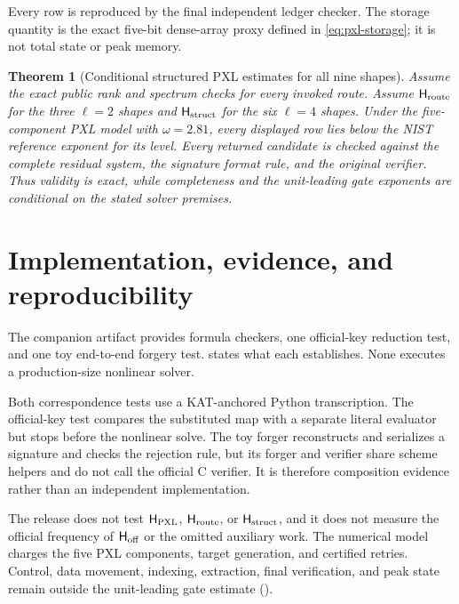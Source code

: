 \documentclass[11pt]{article}
\newtheorem{theorem}{Theorem}[section]
\begin{document}
Every row is reproduced by the final independent ledger checker.  The storage
quantity is the exact five-bit dense-array proxy defined in
\eqref{eq:pxl-storage}; it is not total state or peak memory.

\begin{theorem}[Conditional structured PXL estimates for all nine shapes]
\label{thm:pxl-all-nine-structured}
Assume the exact public rank and spectrum checks for every invoked route.
Assume $\mathsf H_{\rm route}$ for the three $\ell=2$ shapes and
$\mathsf H_{\rm struct}$ for the six $\ell=4$ shapes.  Under the
five-component PXL model with $\omega=2.81$, every displayed row lies below
the NIST reference exponent for its level.  Every returned candidate is
checked against the complete residual system, the signature format rule, and
the original verifier.  Thus validity is exact, while completeness and the
unit-leading gate exponents are conditional on the stated solver premises.
\end{theorem}

\section{Implementation, evidence, and reproducibility}
\label{sec:implementation}

The companion artifact provides formula checkers, one official-key reduction
test, and one toy end-to-end forgery test.  
states what each establishes.  None executes a production-size nonlinear
solver.


Both correspondence tests use a KAT-anchored Python transcription.  The
official-key test compares the substituted map with a separate literal
evaluator but stops before the nonlinear solve.  The toy forger reconstructs
and serializes a signature and checks the rejection rule, but its forger and
verifier share scheme helpers and do not call the official C verifier.  It is
therefore composition evidence rather than an independent implementation.

The release does not test $\mathsf H_{\rm PXL}$,
$\mathsf H_{\rm route}$, or $\mathsf H_{\rm struct}$, and it does not measure
the official frequency of $\mathsf H_{\rm off}$ or the omitted auxiliary work.
The numerical model charges the five PXL components, target generation, and
certified retries.  Control, data movement, indexing, extraction, final
verification, and peak state remain outside the unit-leading gate estimate
().
\end{document}
